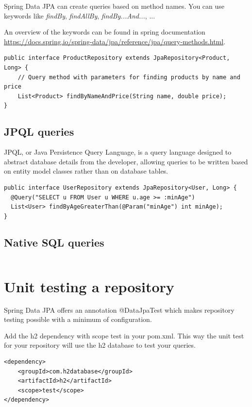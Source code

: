 \begin{itemize}
Spring Data JPA can create queries based on method names. You can use keywords like \textit{findBy}, \textit{findAllBy},
\textit{findBy...And...}, ...

An overview of the keywords can be found in spring documentation \url{https://docs.spring.io/spring-data/jpa/reference/jpa/query-methods.html}.

\begin{lstlisting}
public interface ProductRepository extends JpaRepository<Product, Long> {
    // Query method with parameters for finding products by name and price
    List<Product> findByNameAndPrice(String name, double price);
}
\end{lstlisting}

\subsection{JPQL queries}

JPQL, or Java Persistence Query Language, is a query language designed to abstract database details from the developer, allowing queries to be written based on entity model classes rather than on database tables.


\begin{lstlisting}
public interface UserRepository extends JpaRepository<User, Long> {
  @Query("SELECT u FROM User u WHERE u.age >= :minAge")
  List<User> findByAgeGreaterThan(@Param("minAge") int minAge);
}
\end{lstlisting}

\subsection{Native SQL queries}

\begin{lstlisting}

\end{lstlisting}


\section{Unit testing a repository}

Spring Data JPA offers an annotation @DataJpaTest which makes repository testing possible with a minimum of configuration. 

Add the h2 dependency with scope test in your pom.xml. This way the unit test for your repository will use the h2 database to test your queries.

\begin{lstlisting}
<dependency>
	<groupId>com.h2database</groupId>
	<artifactId>h2</artifactId>
	<scope>test</scope>
</dependency>
\end{lstlisting}


\end{itemize}
